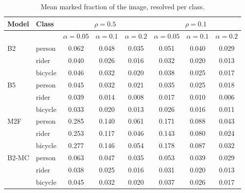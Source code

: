 \begin{table}[t]
\centering
\scriptsize
\setlength{\tabcolsep}{2pt}
\begin{tabular}{llcccccc}
\toprule
Model & Class & \multicolumn{3}{c}{$\rho=0.5$} & \multicolumn{3}{c}{$\rho=0.1$} \\
\midrule
 & & $\alpha=0.05$ & $\alpha=0.1$ & $\alpha=0.2$ & $\alpha=0.05$ & $\alpha=0.1$ & $\alpha=0.2$ \\
\midrule
B2 & person & 0.062 & 0.048 & 0.035 & 0.051 & 0.040 & 0.029 \\
 & rider & 0.040 & 0.026 & 0.016 & 0.032 & 0.020 & 0.013 \\
 & bicycle & 0.046 & 0.032 & 0.020 & 0.038 & 0.025 & 0.017 \\
\addlinespace
B5 & person & 0.045 & 0.032 & 0.021 & 0.035 & 0.025 & 0.018 \\
 & rider & 0.039 & 0.014 & 0.008 & 0.017 & 0.010 & 0.006 \\
 & bicycle & 0.033 & 0.020 & 0.013 & 0.026 & 0.016 & 0.011 \\
\addlinespace
M2F & person & 0.285 & 0.140 & 0.061 & 0.171 & 0.088 & 0.043 \\
 & rider & 0.253 & 0.117 & 0.046 & 0.143 & 0.080 & 0.024 \\
 & bicycle & 0.277 & 0.146 & 0.054 & 0.178 & 0.087 & 0.032 \\
\addlinespace
B2-MC & person & 0.063 & 0.047 & 0.035 & 0.053 & 0.039 & 0.029 \\
 & rider & 0.038 & 0.025 & 0.016 & 0.031 & 0.020 & 0.013 \\
 & bicycle & 0.045 & 0.032 & 0.020 & 0.037 & 0.026 & 0.017 \\
\bottomrule
\end{tabular}
\caption{Mean marked fraction of the image, resolved per class.}
\label{tab:perclass_area}
\end{table}

